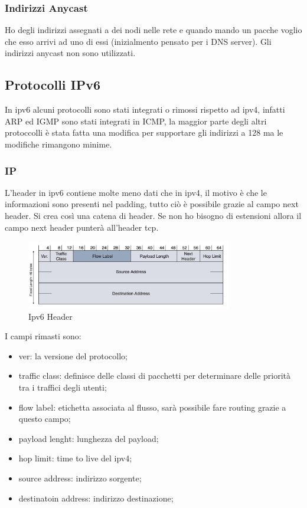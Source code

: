 \documentclass[12pt]{article}
\begin{document}
\subsubsection{Indirizzi Anycast}
Ho degli indirizzi assegnati a dei nodi nelle rete e quando mando un pacche voglio che esso arrivi ad uno di essi (inizialmento pensato per i DNS server). Gli indirizzi anycast non sono utilizzati.


\newpage
\subsection{Protocolli IPv6}
In ipv6 alcuni protocolli sono stati integrati o rimossi rispetto ad ipv4, infatti ARP ed IGMP sono stati integrati in ICMP, la maggior parte degli altri protoccolli \`e stata fatta una modifica per supportare gli indirizzi a 128 ma le modifiche rimangono minime.

\subsubsection{IP}
L'header in ipv6 contiene molte meno dati che in ipv4, il motivo \`e che le informazioni sono presenti nel padding, tutto ci\`o \`e possibile grazie al campo next header. Si crea cos\`i una catena di header. Se non ho bisogno di estensioni allora il campo next header punter\`a all'header tcp.
\begin{figure}[H]
    \centering
    \includegraphics[width=0.8\textwidth]{ipv6-header.png}
    \caption{Ipv6 Header}
    \label{fig:ipv6-header}
\end{figure}
I campi rimasti sono:
\begin{itemize}
    \item ver: la versione del protocollo;
    \item traffic class: definisce delle classi di pacchetti per determinare delle priorit\`a tra i traffici degli utenti;
    \item flow label: etichetta associata al flusso, sar\`a possibile fare routing grazie a questo campo;
    \item payload lenght: lunghezza del payload;
    \item hop limit: time to live del ipv4;
    \item source address: indirizzo sorgente;
    \item destinatoin address: indirizzo destinazione;
\end{itemize}
\end{document}
